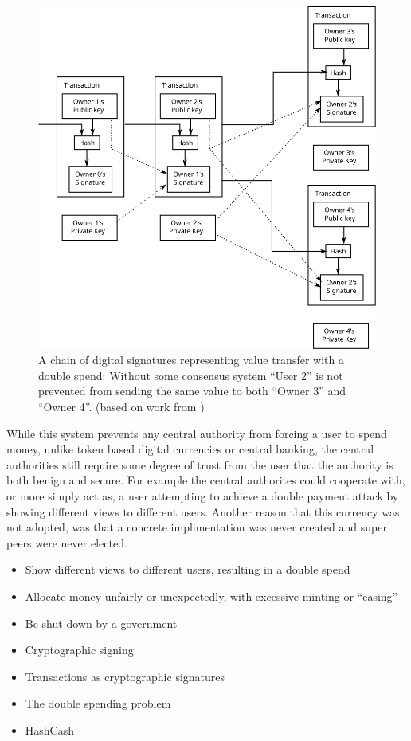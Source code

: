 \begin{figure}[t!]
    \centering
    \includegraphics[width=\columnwidth]{img/Bitcoin_DoubleSpend_Visual}
    \caption{A chain of digital signatures representing value transfer with a double spend: Without some consensus system ``User 2'' is not prevented from sending the same value to both ``Owner 3'' and ``Owner 4''.
    (based on work from \protect\cite{satoshi})}
    \label{fig:chain-double-spend}
\end{figure}

While this system prevents any central authority from forcing a user to spend money, unlike token based digital currencies or central banking, the central authorities still require some degree of trust from the user that the authority is both benign and secure. For example the central authorites could cooperate with, or more simply act as, a user attempting to achieve a double payment attack by showing different views to different users. Another reason that this currency was not adopted, was that a concrete implimentation was never created and super peers were never elected.

\begin{itemize} \item Show different views to different users, resulting in a
        double spend \item Allocate money unfairly or unexpectedly, with
        excessive minting or ``easing'' \item Be shut down by a government \item
        Cryptographic signing \item Transactions as cryptographic signatures
        \item The double spending problem \item HashCash \end{itemize}

